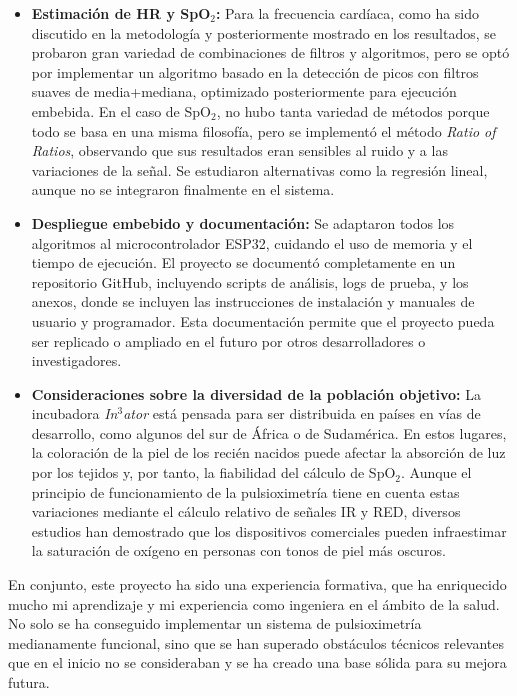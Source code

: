 \begin{itemize}
\item \textbf{Estimación de HR y SpO$_2$:} Para la frecuencia cardíaca, como ha sido discutido en la metodología y posteriormente mostrado en los resultados, se probaron gran variedad de combinaciones de filtros y algoritmos, pero se optó por implementar un algoritmo basado en la detección de picos con filtros suaves de media+mediana, optimizado posteriormente para ejecución embebida. En el caso de SpO$_2$, no hubo tanta variedad de métodos porque todo se basa en una misma filosofía, pero se implementó el método \textit{Ratio of Ratios}, observando que sus resultados eran sensibles al ruido y a las variaciones de la señal. Se estudiaron alternativas como la regresión lineal, aunque no se integraron finalmente en el sistema.

\item \textbf{Despliegue embebido y documentación:} Se adaptaron todos los algoritmos al microcontrolador ESP32, cuidando el uso de memoria y el tiempo de ejecución. El proyecto se documentó completamente en un repositorio GitHub, incluyendo scripts de análisis, logs de prueba, y los anexos, donde se incluyen las instrucciones de instalación y manuales de usuario y programador. Esta documentación permite que el proyecto pueda ser replicado o ampliado en el futuro por otros desarrolladores o investigadores.

\item \textbf{Consideraciones sobre la diversidad de la población objetivo:} La incubadora \textit{In$^3$ator} está pensada para ser distribuida en países en vías de desarrollo, como algunos del sur de África o de Sudamérica. En estos lugares, la coloración de la piel de los recién nacidos puede afectar la absorción de luz por los tejidos y, por tanto, la fiabilidad del cálculo de SpO$_2$. Aunque el principio de funcionamiento de la pulsioximetría tiene en cuenta estas variaciones mediante el cálculo relativo de señales IR y RED, diversos estudios han demostrado que los dispositivos comerciales pueden infraestimar la saturación de oxígeno en personas con tonos de piel más oscuros.

\end{itemize}

En conjunto, este proyecto ha sido una experiencia formativa, que ha enriquecido mucho mi aprendizaje y mi experiencia como ingeniera en el ámbito de la salud. No solo se ha conseguido implementar un sistema de pulsioximetría medianamente funcional, sino que se han superado obstáculos técnicos relevantes que en el inicio no se consideraban y se ha creado una base sólida para su mejora futura.

